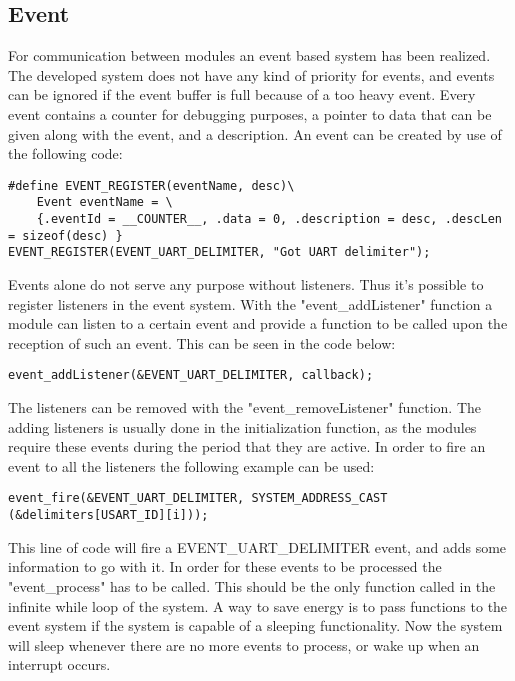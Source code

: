 \subsection{Event}
For communication between modules an event based system has been realized. The developed system does not have any kind of priority for events, and events can be ignored if the event buffer is full because of a too heavy event. Every event contains a counter for debugging purposes, a pointer to data that can be given along with the event, and a description. An event can be created by use of the following code:
\begin{verbatim}
#define EVENT_REGISTER(eventName, desc)\
	Event eventName = \
	{.eventId = __COUNTER__, .data = 0, .description = desc, .descLen = sizeof(desc) }
EVENT_REGISTER(EVENT_UART_DELIMITER, "Got UART delimiter");
\end{verbatim}
Events alone do not serve any purpose without listeners. Thus it's possible to register listeners in the event system. With the "event\_addListener" function a module can listen to a certain event and provide a function to be called upon the reception of such an event. This can be seen in the code below:
\begin{verbatim}
event_addListener(&EVENT_UART_DELIMITER, callback);
\end{verbatim}
The listeners can be removed with the "event\_removeListener" function. The adding listeners is usually done in the initialization function, as the modules require these events during the period that they are active. In order to fire an event to all the listeners the following example can be used: 
\begin{verbatim}
event_fire(&EVENT_UART_DELIMITER, SYSTEM_ADDRESS_CAST (&delimiters[USART_ID][i]));
\end{verbatim}
This line of code will fire a EVENT\_UART\_DELIMITER event, and adds some information to go with it.\newpar
In order for these events to be processed the "event\_process" has to be called. This should be the only function called in the infinite while loop of the system. A way to save energy is to pass functions to the event system if the system is capable of a sleeping functionality. Now the system will sleep whenever there are no more events to process, or wake up when an interrupt occurs.
